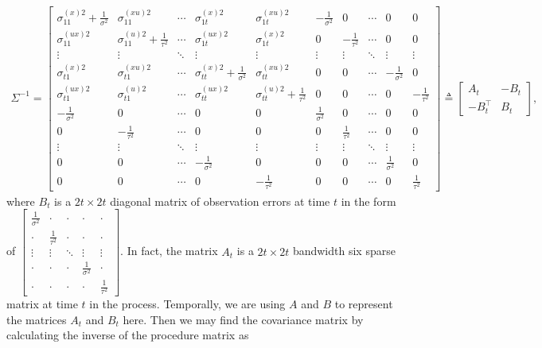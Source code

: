 \begin{align*} \Sigma^{-1}=
\begin{bmatrix}
\sigma_{11}^{(x)2}+\frac{1}{\sigma^2} & \sigma_{11}^{(xu)2} & \cdots & \sigma_{1t}^{(x)2} & \sigma_{1t}^{(xu)2}  &  -\frac{1}{\sigma^2} & 0 & \cdots & 0 & 0\\
\sigma_{11}^{(ux)2}   & \sigma_{11}^{(u)2} +\frac{1}{\tau^2} & \cdots & \sigma_{1t}^{(ux)2} & \sigma_{1t}^{(x)2}  &  0 & -\frac{1}{\tau^2} & \cdots & 0 & 0 \\
\vdots & \vdots & \ddots & \vdots & \vdots & \vdots & \vdots &\ddots & \vdots & \vdots \\
\sigma_{t1}^{(x)2}   & \sigma_{t1}^{(xu)2} & \cdots & \sigma_{tt}^{(x)2} +\frac{1}{\sigma^2}  & \sigma_{tt}^{(xu)2}  &  0 & 0 & \cdots & -\frac{1}{\sigma^2} & 0 \\
\sigma_{t1}^{(ux)2}   & \sigma_{t1}^{(u)2} & \cdots & \sigma_{tt}^{(ux)2} & \sigma_{tt}^{(u)2} +\frac{1}{\tau^2}  &  0 & 0 & \cdots & 0 &-\frac{1}{\tau^2} \\
- \frac{1}{\sigma^2} & 0 & \cdots & 0 & 0 &  \frac{1}{\sigma^2} & 0 & \cdots & 0 & 0\\
0  & -\frac{1}{\tau^2}& \cdots & 0 & 0 &  0 &  \frac{1}{\tau^2} & \cdots & 0 & 0 \\
\vdots & \vdots & \ddots & \vdots & \vdots & \vdots & \vdots &\ddots & \vdots & \vdots \\
0 & 0& \cdots & -\frac{1}{\sigma^2}  &0&  0 & 0 & \cdots & \frac{1}{\sigma^2} & 0 \\
0 & 0 & \cdots & 0 & -\frac{1}{\tau^2}   &  0 & 0 & \cdots & 0 & \frac{1}{\tau^2}
\end{bmatrix} \triangleq \begin{bmatrix}
A_t& -B_t \\ -B_t^\top & B_t
\end{bmatrix},
\end{align*}
where $B_t$ is a $2t\times 2t$ diagonal matrix of observation errors at time $t$ in the form of $\begin{bmatrix}
\frac{1}{\sigma^2}& \cdot & \cdot &  \cdot  &  \cdot \\  \cdot & \frac{1}{\tau^2} & \cdot &  \cdot  &  \cdot  \\ 
\vdots & \vdots & \ddots & \vdots & \vdots \\
 \cdot  &  \cdot  & \cdot  & \frac{1}{\sigma^2}&  \cdot \\  \cdot  &  \cdot & \cdot  &  \cdot  & \frac{1}{\tau^2}
\end{bmatrix}$. 
In fact, the matrix $A_t$ is a $2t \times 2t$ bandwidth six sparse matrix at time $t$ in the process. Temporally, we are using $A$ and $B$ to represent the matrices  $A_t$ and $B_t$ here. Then we may find the covariance matrix by calculating the inverse of the procedure matrix as 
